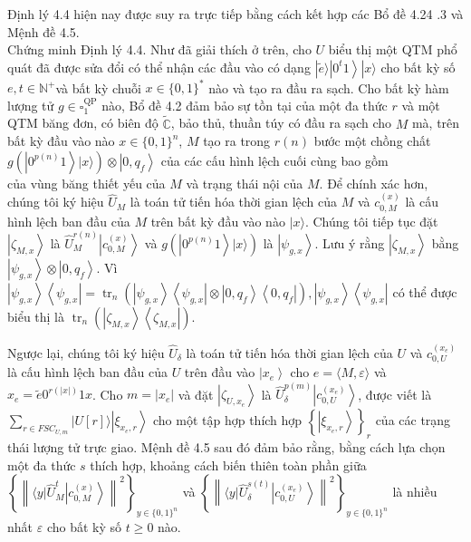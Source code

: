 \documentclass[10pt]{article}
\begin{document}
Định lý 4.4 hiện nay được suy ra trực tiếp bằng cách kết hợp các Bổ đề 4.24 .3 và Mệnh đề 4.5.\\
Chứng minh Định lý 4.4. Như đã giải thích ở trên, cho $U$ biểu thị một QTM phổ quát đã được sửa đổi có thể nhận các đầu vào có dạng $|\tilde{e}\rangle\left|0^{t} 1\right\rangle|x\rangle$ cho bất kỳ số $e, t \in \mathbb{N}^{+}$và bất kỳ chuỗi $x \in\{0,1\}^{*}$ nào và tạo ra đầu ra sạch. Cho bất kỳ hàm lượng tử $g \in \square_{1}^{\mathrm{QP}}$ nào, Bổ đề 4.2 đảm bảo sự tồn tại của một đa thức $r$ và một QTM băng đơn, có biên độ $\tilde{\mathbb{C}}$, bảo thủ, thuần túy có đầu ra sạch cho $M$ mà, trên bất kỳ đầu vào nào $x \in\{0,1\}^{n}$, $M$ tạo ra trong $r(n)$ bước một chồng chất $g\left(\left|0^{p(n)} 1\right\rangle|x\rangle\right) \otimes\left|0, q_{f}\right\rangle$ của các cấu hình lệch cuối cùng bao gồm\\
của vùng băng thiết yếu của $M$ và trạng thái nội của $M$. Để chính xác hơn, chúng tôi ký hiệu $\widehat{U}_{M}$ là toán tử tiến hóa thời gian lệch của $M$ và $c_{0, M}^{(x)}$ là cấu hình lệch ban đầu của $M$ trên bất kỳ đầu vào nào $|x\rangle$. Chúng tôi tiếp tục đặt $\left|\zeta_{M, x}\right\rangle$ là $\widehat{U}_{M}^{r(n)}\left|c_{0, M}^{(x)}\right\rangle$ và $g\left(\left|0^{p(n)} 1\right\rangle|x\rangle\right)$ là $\left|\psi_{g, x}\right\rangle$. Lưu ý rằng $\left|\zeta_{M, x}\right\rangle$ bằng $\left|\psi_{g, x}\right\rangle \otimes\left|0, q_{f}\right\rangle$. Vì $\left|\psi_{g, x}\right\rangle\left\langle\psi_{g, x}\right|=\operatorname{tr}_{n}\left(\left|\psi_{g, x}\right\rangle\left\langle\psi_{g, x}\right| \otimes\left|0, q_{f}\right\rangle\left\langle 0, q_{f}\right|\right),\left|\psi_{g, x}\right\rangle\left\langle\psi_{g, x}\right|$ có thể được biểu thị là $\operatorname{tr}_{n}\left(\left|\zeta_{M, x}\right\rangle\left\langle\zeta_{M, x}\right|\right)$.

Ngược lại, chúng tôi ký hiệu $\widehat{U}_{\delta}$ là toán tử tiến hóa thời gian lệch của $U$ và $c_{0, U}^{\left(x_{e}\right)}$ là cấu hình lệch ban đầu của $U$ trên đầu vào $\left|x_{e}\right\rangle$ cho $e=\langle M, \varepsilon\rangle$ và $x_{e}=\tilde{e} 0^{r(|x|)} 1 x$. Cho $m=\left|x_{e}\right|$ và đặt $\left|\zeta_{U, x_{e}}\right\rangle$ là $\widehat{U}_{\delta}^{p(m)}\left|c_{0, U}^{\left(x_{e}\right)}\right\rangle$, được viết là $\sum_{r \in F S C_{U, m}}|U[r]\rangle\left|\xi_{x_{e}, r}\right\rangle$ cho một tập hợp thích hợp $\left\{\left|\xi_{x_{e}, r}\right\rangle\right\}_{r}$ của các trạng thái lượng tử trực giao. Mệnh đề 4.5 sau đó đảm bảo rằng, bằng cách lựa chọn một đa thức $s$ thích hợp, khoảng cách biến thiên toàn phần giữa $\left\{\left\|\langle y| \widehat{U}_{M}^{t}\left|c_{0, M}^{(x)}\right\rangle\right\|^{2}\right\}_{y \in\{0,1\}^{n}}$ và $\left\{\left\|\langle y| \widehat{U}_{\delta}^{s(t)}\left|c_{0, U}^{\left(x_{e}\right)}\right\rangle\right\|^{2}\right\}_{y \in\{0,1\}^{n}}$ là nhiều nhất $\varepsilon$ cho bất kỳ số $t \geq 0$ nào.
\end{document}
